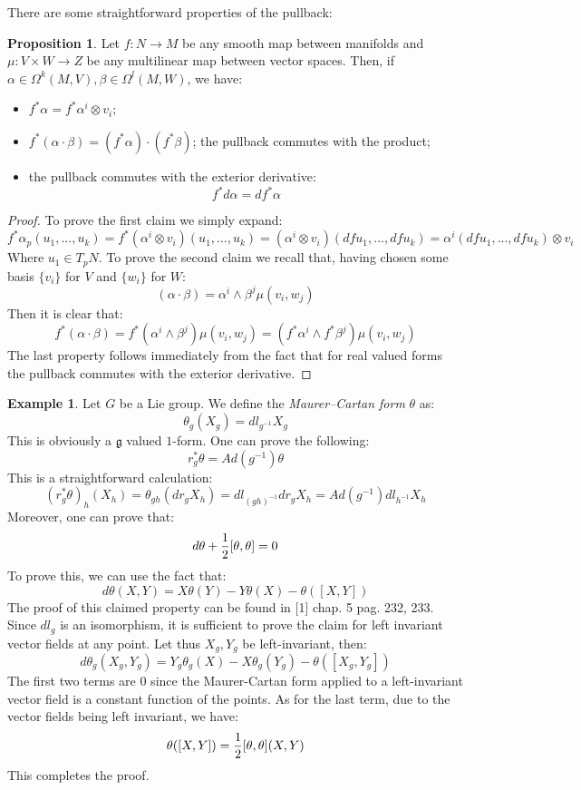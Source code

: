 \documentclass[12pt,a4paper]{report}
\theoremstyle{definition}
\theoremstyle{Theorem}
\newtheorem{Prop}[Def]{Proposition}
\theoremstyle{definition}
\newtheorem{Ex}[Def]{Example}
\theoremstyle{definition}
\begin{document}
	There are some straightforward properties of the pullback:
	\begin{Prop}\label{Prop_3.4.3}
		Let $f:N\rightarrow M$ be any smooth map between manifolds and $\mu:V\times W\rightarrow Z$ be any multilinear map between vector spaces. Then, if $\alpha\in\Omega^k(M,V),\beta\in\Omega^l(M,W)$, we have:
		\begin{itemize}
			\item $f^*\alpha=f^*\alpha^i\otimes v_i$;
			\item $f^*(\alpha\cdot \beta)=(f^*\alpha)\cdot (f^*\beta)$; the pullback commutes with the product;
			\item the pullback commutes with the exterior derivative:
			$$f^*d\alpha=df^*\alpha$$
		\end{itemize}
	\end{Prop}
	\begin{proof}
		To prove the first claim we simply expand:
		$$f^*\alpha_p(u_1,...,u_k)=f^*(\alpha^i\otimes v_i)(u_1,...,u_k)=(\alpha^i\otimes v_i)(dfu_1,...,dfu_k)=\alpha^i(dfu_1,...,dfu_k)\otimes v_i$$
		Where $u_1\in T_pN$. To prove the second claim we recall that, having chosen some basis $\{v_i\}$ for $V$ and $\{w_i\}$ for $W$:
		$$(\alpha\cdot\beta)=\alpha^i\wedge\beta^j\mu(v_i,w_j)$$
		Then it is clear that:
		$$f^*(\alpha\cdot\beta)=f^*(\alpha^i\wedge\beta^j)\mu(v_i,w_j)=(f^*\alpha^i\wedge f^*\beta^j)\mu(v_i,w_j)$$
		The last property follows immediately from the fact that for real valued forms the pullback commutes with the exterior derivative.
	\end{proof}
	\begin{Ex}\label{Ex_3.4.2}
		Let $G$ be a Lie group. We define the \textit{Maurer–Cartan form} $\theta$ as:
		$$\theta_g(X_g)=dl_{g^{-1}}X_g$$
		This is obviously a $\mathfrak{g}$ valued $1$-form. One can prove the following:
		$$r_g^*\theta=Ad(g^{-1})\theta$$
		This is a straightforward calculation:
		$$(r_g^*\theta)_{h}(X_{h})=\theta_{gh}(dr_gX_h)=dl_{(gh)^{-1}}dr_gX_h=Ad(g^{-1})dl_{h^{-1}}X_h$$
		Moreover, one can prove that:
		$$d\theta+{1\over 2}[\theta,\theta]=0$$
		To prove this, we can use the fact that:
		$$d\theta(X,Y)=X\theta(Y)-Y\theta(X)-\theta([X,Y])$$
		The proof of this claimed property can be found in [1] chap. 5 pag. 232, 233. Since $dl_g$ is an isomorphism, it is sufficient to prove the claim for left invariant vector fields at any point. Let thus $X_g,Y_g$ be left-invariant, then:
		$$d\theta_g(X_g,Y_g)=Y_g\theta_g(X)-X\theta_g(Y_g)-\theta([X_g,Y_g])$$
		The first two terms are 0 since the Maurer-Cartan form applied to a left-invariant vector field is a constant function of the points. As for the last term, due to the vector fields being left invariant, we have:
		$$\theta([X,Y])={1\over 2}[\theta,\theta](X,Y)$$
		This completes the proof.
	\end{Ex}
\end{document}
